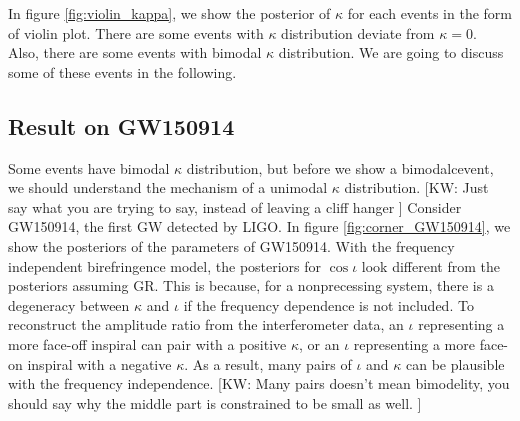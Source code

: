 \documentclass[aps,prd,twocolumn,superscriptaddress,preprintnumbers,floatfix,nofootinbib]{revtex4-2}
\newcommand{\kw}[1]{{\color{rb4}[KW: #1 ]}}
\begin{document}
In figure \ref{fig:violin_kappa}, we show the posterior of $\kappa$ for each events in the form of violin plot.
There are some events with $\kappa$ distribution deviate from $\kappa=0$.
Also, there are some events with bimodal $\kappa$ distribution.
We are going to discuss some of these events in the following.





\subsection{Result on GW150914}
Some events have bimodal $\kappa$ distribution, but before we show a bimodalcevent, we should understand the mechanism of a unimodal $\kappa$ distribution.
\kw{Just say what you are trying to say, instead of leaving a cliff hanger}
Consider GW150914, the first GW detected by LIGO.
In figure \ref{fig:corner_GW150914}, we show the posteriors of the parameters of GW150914.
With the frequency independent birefringence model, the posteriors for $\cos\iota$ look different from the posteriors assuming GR.
This is because, for a nonprecessing system, there is a degeneracy between $\kappa$ and $\iota$ if the frequency dependence is not included.
To reconstruct the amplitude ratio from the interferometer data, an $\iota$ representing a more face-off inspiral can pair with a positive $\kappa$, or an $\iota$ representing a more face-on inspiral with a negative $\kappa$.
As a result, many pairs of $\iota$ and $\kappa$ can be plausible with the frequency independence.
\kw{Many pairs doesn't mean bimodelity, you should say why the middle part is constrained to be small as well.}
\end{document}
